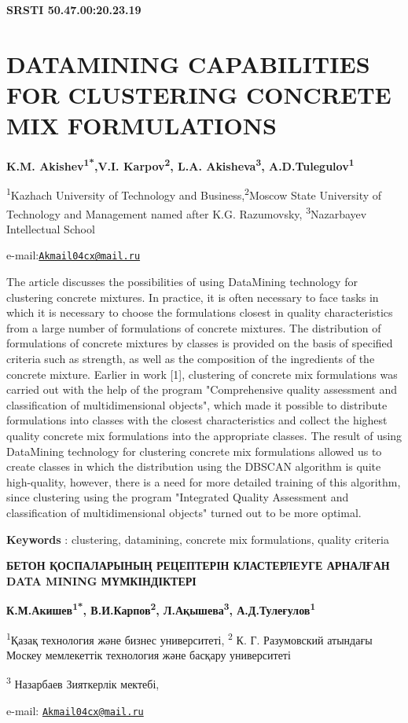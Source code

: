 {\bfseries SRSTI 50.47.00:20.23.19}

\section{DATAMINING CAPABILITIES FOR CLUSTERING CONCRETE MIX
FORMULATIONS}

\begin{center}
{\bfseries K.M. Akishev\textsuperscript{1*},V.I. Karpov\textsuperscript{2},
L.A. Akisheva\textsuperscript{3}, A.D.Tulegulov\textsuperscript{1}}

\textsuperscript{1}Kazhach University of Technology and
Business,\textsuperscript{2}Moscow State University of Technology and
Management named after K.G. Razumovsky, \textsuperscript{3}Nazarbayev
Intellectual School

e-mail:\href{mailto:Akmail04cx@mail.ru}{\nolinkurl{Akmail04cx@mail.ru}}
\end{center}

The article discusses the possibilities of using DataMining technology
for clustering concrete mixtures. In practice, it is often necessary to
face tasks in which it is necessary to choose the formulations closest
in quality characteristics from a large number of formulations of
concrete mixtures. The distribution of formulations of concrete mixtures
by classes is provided on the basis of specified criteria such as
strength, as well as the composition of the ingredients of the concrete
mixture. Earlier in work {[}1{]}, clustering of concrete mix
formulations was carried out with the help of the program "Comprehensive
quality assessment and classification of multidimensional objects",
which made it possible to distribute formulations into classes with the
closest characteristics and collect the highest quality concrete mix
formulations into the appropriate classes. The result of using
DataMining technology for clustering concrete mix formulations allowed
us to create classes in which the distribution using the DBSCAN
algorithm is quite high-quality, however, there is a need for more
detailed training of this algorithm, since clustering using the program
"Integrated Quality Assessment and classification of multidimensional
objects" turned out to be more optimal.

{\bfseries Keywords} : clustering, datamining, concrete mix formulations,
quality criteria

\begin{center}
{\large\bfseries БЕТОН ҚОСПАЛАРЫНЫҢ РЕЦЕПТЕРІН КЛАСТЕРЛЕУГЕ АРНАЛҒАН DATA MINING
МҮМКІНДІКТЕРІ}

{\bfseries К.М.Акишев\textsuperscript{1*}, В.И.Карпов\textsuperscript{2},
Л.Ақышева\textsuperscript{3}, А.Д.Тулеғулов\textsuperscript{1}}

\textsuperscript{1}Қазақ технология және бизнес университеті,
\textsuperscript{2} К. Г. Разумовский атындағы Москеу мемлекеттік
технология және басқару университеті

\textsuperscript{3} Назарбаев Зияткерлік мектебі,

e-mail: \href{mailto:Akmail04cx@mail.ru}{\nolinkurl{Akmail04cx@mail.ru}}
\end{center}

